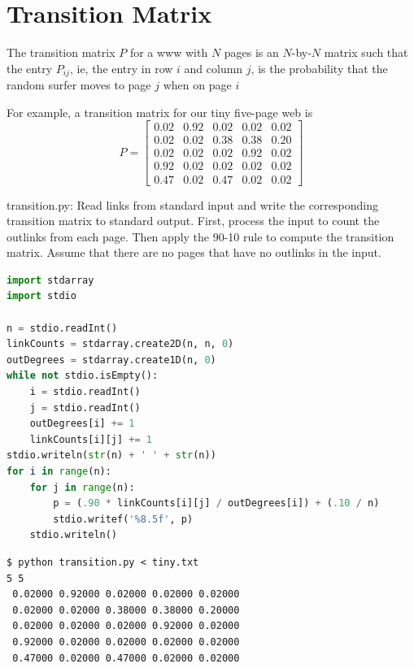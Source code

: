 \documentclass[8pt,a4paper,compress]{beamer}
\begin{document}
\section{Transition Matrix}
\begin{frame}[fragile]
The transition matrix $P$ for a www with $N$ pages is an $N$-by-$N$ matrix such that the entry $P_{ij}$, ie, the entry in row $i$ and column $j$, is the probability that the random surfer moves to page $j$ when on page $i$

\bigskip

For example, a transition matrix for our tiny five-page web is
\[
P = \begin{bmatrix}
0.02 & 0.92 & 0.02 & 0.02 & 0.02 \\
0.02 & 0.02 & 0.38 & 0.38 & 0.20 \\
0.02 & 0.02 & 0.02 & 0.92 & 0.02 \\
0.92 & 0.02 & 0.02 & 0.02 & 0.02 \\
0.47 & 0.02 & 0.47 & 0.02 & 0.02
\end{bmatrix}
\]
\end{frame}
\begin{frame}[fragile]
\begin{framed}
\tiny transition.py: Read links from standard input and write the corresponding transition matrix to standard output. First, process the input to count the outlinks from each page. Then apply the 90-10 rule to compute the transition matrix. Assume that there are no pages that have no outlinks in the input.
\end{framed}

\begin{lstlisting}[language=Python]
import stdarray
import stdio

n = stdio.readInt()
linkCounts = stdarray.create2D(n, n, 0)
outDegrees = stdarray.create1D(n, 0)
while not stdio.isEmpty():
    i = stdio.readInt()
    j = stdio.readInt()
    outDegrees[i] += 1
    linkCounts[i][j] += 1
stdio.writeln(str(n) + ' ' + str(n))
for i in range(n):
    for j in range(n):
        p = (.90 * linkCounts[i][j] / outDegrees[i]) + (.10 / n)
        stdio.writef('%8.5f', p)
    stdio.writeln()
\end{lstlisting}

\begin{lstlisting}[language={}]
$ python transition.py < tiny.txt
5 5
 0.02000 0.92000 0.02000 0.02000 0.02000
 0.02000 0.02000 0.38000 0.38000 0.20000
 0.02000 0.02000 0.02000 0.92000 0.02000
 0.92000 0.02000 0.02000 0.02000 0.02000
 0.47000 0.02000 0.47000 0.02000 0.02000
\end{lstlisting}
\end{frame}
\end{document}
